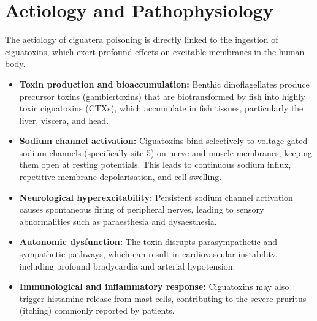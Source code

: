 \section*{Aetiology and Pathophysiology}
The aetiology of ciguatera poisoning is directly linked to the ingestion of ciguatoxins, which exert profound effects on excitable membranes in the human body.
\begin{itemize}
    \item \textbf{Toxin production and bioaccumulation:} Benthic dinoflagellates produce precursor toxins (gambiertoxins) that are biotransformed by fish into highly toxic ciguatoxins (CTXs), which accumulate in fish tissues, particularly the liver, viscera, and head.
    \item \textbf{Sodium channel activation:} Ciguatoxins bind selectively to voltage-gated sodium channels (specifically site 5) on nerve and muscle membranes, keeping them open at resting potentials. This leads to continuous sodium influx, repetitive membrane depolarisation, and cell swelling.
    \item \textbf{Neurological hyperexcitability:} Persistent sodium channel activation causes spontaneous firing of peripheral nerves, leading to sensory abnormalities such as paraesthesia and dysaesthesia.
    \item \textbf{Autonomic dysfunction:} The toxin disrupts parasympathetic and sympathetic pathways, which can result in cardiovascular instability, including profound bradycardia and arterial hypotension.
    \item \textbf{Immunological and inflammatory response:} Ciguatoxins may also trigger histamine release from mast cells, contributing to the severe pruritus (itching) commonly reported by patients.
\end{itemize}

